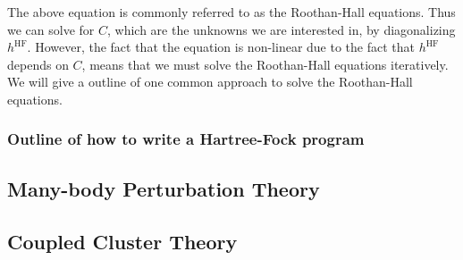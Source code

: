 \documentclass[a4paper,10pt]{article}
\theoremstyle{definition}
\begin{document}
The above equation is commonly referred to as the Roothan-Hall equations. Thus we can solve for $C$, which 
are the unknowns we are interested in, by diagonalizing $h^\text{HF}$. However, the fact that the equation is non-linear
due to the fact that $h^{\text{HF}}$ depends on $C$, means that we must solve the Roothan-Hall equations iteratively.
We will give a outline of one common approach to solve the Roothan-Hall equations.

\subsubsection{Outline of how to write a Hartree-Fock program}




\subsection{Many-body Perturbation Theory}

\subsection{Coupled Cluster Theory}
\end{document}
